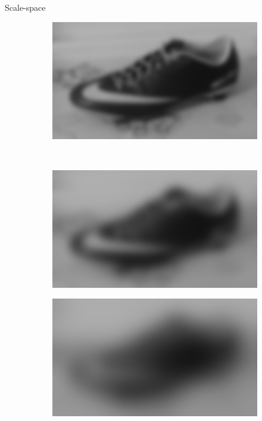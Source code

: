 \documentclass[14pt,t]{beamer}
\begin{document}
\begin{frame}{Scale-space}
\begin{figure}[p]
\begin{subfigure}[t]{0.4\textwidth}
	\end{subfigure}
	\begin{subfigure}[t]{0.4\textwidth}
		\includegraphics[width=\textwidth]{img/scaleSpaceTheory_16.png}
	\end{subfigure}\\
	\vspace{0.75mm}
	\begin{subfigure}[t]{0.4\textwidth}
		\includegraphics[width=\textwidth]{img/scaleSpaceTheory_32.png}
	\end{subfigure}
	\begin{subfigure}[t]{0.4\textwidth}
		\includegraphics[width=\textwidth]{img/scaleSpaceTheory_64.png}
	\end{subfigure}
\end{figure}
\end{frame}
\end{document}
